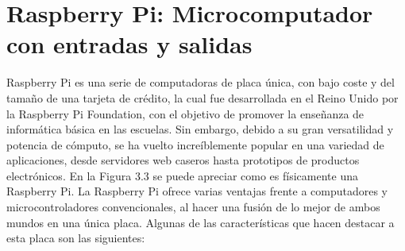 \section{Raspberry Pi: Microcomputador con entradas y salidas}
Raspberry Pi \cite{info:raspberry_pi} es una serie de computadoras de placa única, con  bajo coste y del tamaño de una tarjeta de crédito, la cual fue desarrollada en el Reino Unido por la Raspberry Pi Foundation, con el objetivo de promover la enseñanza de informática básica en las escuelas. Sin embargo, debido a su gran versatilidad y potencia de cómputo, se ha vuelto increíblemente popular en una variedad de aplicaciones, desde servidores web caseros hasta prototipos de productos electrónicos. En la Figura 3.3 se puede apreciar como es físicamente una Raspberry Pi.
La Raspberry Pi ofrece varias ventajas frente a computadores y microcontroladores convencionales, al hacer una fusión de lo mejor de ambos mundos en una única placa. Algunas de las características que hacen destacar a esta placa son las siguientes:
